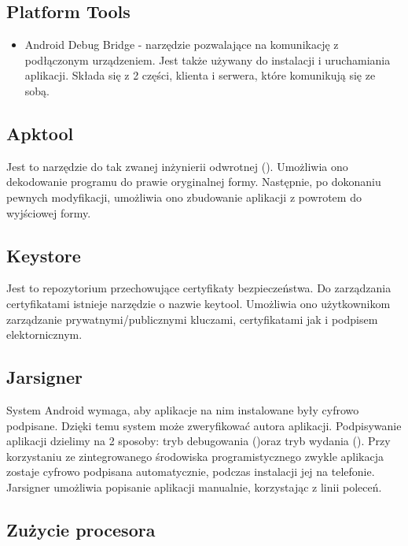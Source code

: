 \subsection{Platform Tools}

\begin{itemize}
\item Android Debug Bridge \label{adb}- narzędzie pozwalające na komunikację z podłączonym urządzeniem. Jest także używany do instalacji i uruchamiania aplikacji. Składa się z 2 części, klienta i serwera, które komunikują się ze sobą.
\end{itemize}

\subsection{Apktool}

Jest to narzędzie do tak zwanej inżynierii odwrotnej (). Umożliwia ono dekodowanie programu do prawie oryginalnej formy. Następnie, po dokonaniu pewnych modyfikacji, umożliwia ono zbudowanie aplikacji z powrotem do wyjściowej formy.\cite{doc:apktool}

\subsection{Keystore}

Jest to repozytorium przechowujące certyfikaty bezpieczeństwa. Do zarządzania certyfikatami istnieje narzędzie o nazwie keytool. Umożliwia ono użytkownikom zarządzanie prywatnymi/publicznymi kluczami, certyfikatami jak i podpisem elektornicznym.\cite{doc:keytool}

\subsection{Jarsigner}

System Android wymaga, aby aplikacje na nim instalowane były cyfrowo podpisane. Dzięki temu system może zweryfikować autora aplikacji. Podpisywanie aplikacji dzielimy na 2 sposoby: tryb debugowania ()oraz tryb wydania (). Przy korzystaniu ze zintegrowanego środowiska programistycznego zwykle aplikacja zostaje cyfrowo podpisana automatycznie, podczas instalacji jej na telefonie. Jarsigner umożliwia popisanie aplikacji manualnie, korzystając z linii poleceń.

\subsection{Zużycie procesora}

